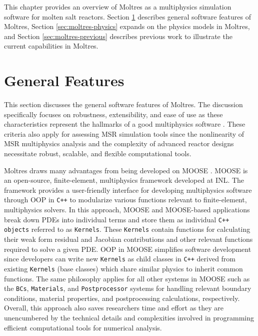 This chapter provides an overview of Moltres as a multiphysics
simulation software for molten salt reactors. 
Section \ref{sec:moltres-features}
describes general software features of Moltres, Section
\ref{sec:moltres-physics} expands on the physics models in Moltres, and Section
\ref{sec:moltres-previous} describes previous work to illustrate the current
capabilities in Moltres.

\section{General Features} \label{sec:moltres-features}

This section discusses the general software features of Moltres. The
discussion specifically focuses on robustness, extensibility, and ease of use
as these characteristics represent the hallmarks of a good multiphysics
software \cite{keyes_multiphysics_2013}. These criteria also apply for
assessing \gls{MSR} simulation tools since the nonlinearity of \gls{MSR}
multiphysics analysis and the complexity of advanced reactor designs
necessitate robust, scalable, and flexible computational tools.

Moltres draws many advantages from being developed on MOOSE
\cite{permann_moose_2020}. MOOSE is an open-source, finite-element,
multiphysics framework developed at \gls{INL}. The framework provides a
user-friendly interface for developing multiphysics software through
\gls{OOP} in \texttt{C++} to modularize various
functions relevant to finite-element, multiphysics solvers. In this approach,
MOOSE and MOOSE-based applications break down \glspl{PDE} into individual terms
and store them as individual \texttt{C++ objects} referred to as
\texttt{Kernels}. These \texttt{Kernels} contain functions for calculating
their weak form residual and Jacobian
contributions and other relevant functions required to solve a given
\gls{PDE}. \gls{OOP} in MOOSE simplifies software development
since developers can write new \texttt{Kernels} as child classes in
\texttt{C++} derived from existing \texttt{Kernels} (base classes) which share
similar physics to inherit common functions.
The same philosophy applies for all other systems in MOOSE such as
the \texttt{BCs}, \texttt{Materials}, and \texttt{Postprocessor}
systems for handling relevant boundary conditions, material properties, and
postprocessing calculations, respectively. Overall, this approach also saves
researchers time and effort as they are unencumbered by the technical details
and complexities involved in programming efficient computational tools for
numerical analysis.

